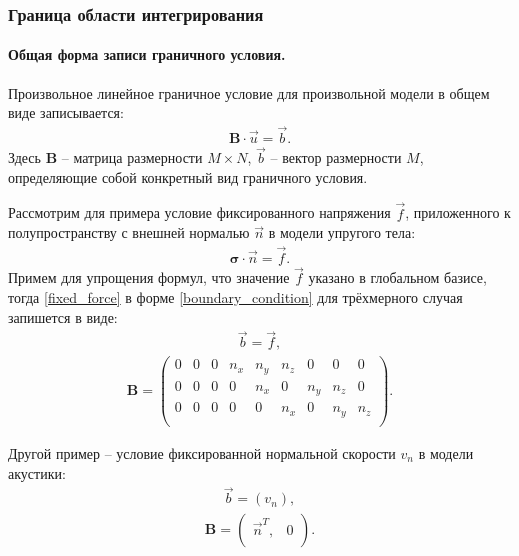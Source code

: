 \documentclass[a4paper]{article}
\numberwithin{equation}{section}
\begin{document}
\subsubsection{Граница области интегрирования}
\paragraph{Общая форма записи граничного условия.}
Произвольное линейное граничное условие для произвольной модели 
в общем виде записывается:
\begin{eqnarray}
\label{boundary_condition}
	\mathbf{B} \cdot \vec{u} = \vec{b}.
\end{eqnarray}
Здесь $\mathbf{B}$ -- матрица размерности $M \times N$, $\vec{b}$ -- вектор размерности $M$, 
определяющие собой конкретный вид граничного условия.

Рассмотрим для примера условие фиксированного напряжения $\vec{f}$, 
приложенного к полупространству с внешней нормалью $\vec{n}$ в модели упругого тела:
\begin{eqnarray}
\label{fixed_force}
	\mathbf{\sigma} \cdot \vec{n} = \vec{f}.
\end{eqnarray}
Примем для упрощения формул, что значение $\vec{f}$ указано в глобальном базисе,
тогда \eqref{fixed_force} в форме \eqref{boundary_condition} 
для трёхмерного случая запишется в виде: 
\begin{eqnarray}
	\vec{b} = \vec{f},
\end{eqnarray}
\begin{align}
\label{fixed_force_global_basis_3D}
	\mathbf{B} =
	\left( \begin{array}{cccccccccccc}
	 0 & 0 & 0 & n_x & n_y & n_z & 0 & 0 & 0 \\
	 0 & 0 & 0 & 0 & n_x & 0 & n_y & n_z & 0 \\
	 0 & 0 & 0 & 0 & 0 & n_x & 0 & n_y & n_z \\
	\end{array} \right).
\end{align}

Другой пример -- условие фиксированной нормальной скорости $v_n$ в модели акустики:
\begin{eqnarray}
	\vec{b} = (v_n),
\end{eqnarray}
\begin{align}
\label{fixed_normal_velocity_acoustic}
	\mathbf{B} =
	\left( \begin{array}{cccccccccccc}
	 \vec{n}^T, & 0 \\
	\end{array} \right).
\end{align}
\end{document}
